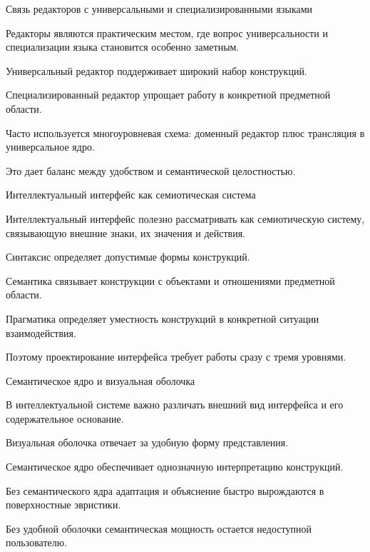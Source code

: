 \begin{frame}{Связь редакторов с универсальными и специализированными языками}
	\topline
	\justifying

	Редакторы являются практическим местом, где вопрос универсальности и специализации языка становится особенно заметным.
	
	\begin{textitemize}
		\item Универсальный редактор поддерживает широкий набор конструкций.
		\item Специализированный редактор упрощает работу в конкретной предметной области.
		\item Часто используется многоуровневая схема: доменный редактор плюс трансляция в универсальное ядро.
		\item Это дает баланс между удобством и семантической целостностью.
	\end{textitemize}
\end{frame}

\begin{frame}{Интеллектуальный интерфейс как семиотическая система}
	\topline
	\justifying

	Интеллектуальный интерфейс полезно рассматривать как семиотическую систему, связывающую внешние знаки, их значения и действия.
	
	\begin{textitemize}
		\item Синтаксис определяет допустимые формы конструкций.
		\item Семантика связывает конструкции с объектами и отношениями предметной области.
		\item Прагматика определяет уместность конструкций в конкретной ситуации взаимодействия.
		\item Поэтому проектирование интерфейса требует работы сразу с тремя уровнями.
	\end{textitemize}
\end{frame}

\begin{frame}{Семантическое ядро и визуальная оболочка}
	\topline
	\justifying

	В интеллектуальной системе важно различать внешний вид интерфейса и его содержательное основание.
	
	\begin{textitemize}
		\item Визуальная оболочка отвечает за удобную форму представления.
		\item Семантическое ядро обеспечивает однозначную интерпретацию конструкций.
		\item Без семантического ядра адаптация и объяснение быстро вырождаются в поверхностные эвристики.
		\item Без удобной оболочки семантическая мощность остается недоступной пользователю.
	\end{textitemize}
\end{frame}

